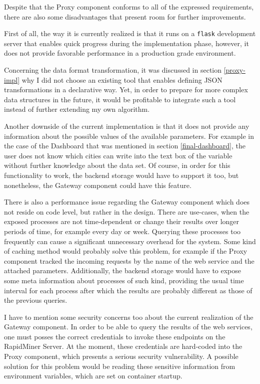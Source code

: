 

Despite that the Proxy component conforms to all of the expressed requirements, there are also some disadvantages that present room for further improvements.

First of all, the way it is currently realized is that it runs on a \texttt{flask} development server that enables quick progress during the implementation phase, however, it does not provide favorable performance in a production grade environment.

Concerning the data format transformation, it was discussed in section \ref{proxy-impl} why I did not choose an existing tool that enables defining JSON transformations in a declarative way. Yet, in order to prepare for more complex data structures in the future, it would be profitable to integrate such a tool instead of further extending my own algorithm.

Another downside of the current implementation is that it does not provide any information about the possible values of the available parameters. For example in the case of the Dashboard that was mentioned in section \ref{final-dashboard}, the user does not know which cities can write into the text box of the variable without further knowledge about the data set. Of course, in order for this functionality to work, the backend storage would have to support it too, but nonetheless, the Gateway component could have this feature.

There is also a performance issue regarding the Gateway component which does not reside on code level, but rather in the design. There are use-cases, when the exposed processes are not time-dependent or change their results over longer periods of time, for example every day or week. Querying these processes too frequently can cause a significant unnecessary overhead for the system. Some kind of caching method would probably solve this problem, for example if the Proxy component tracked the incoming requests by the name of the web service and the attached parameters. Additionally, the backend storage would have to expose some meta information about processes of such kind, providing the usual time interval for each process after which the results are probably different as those of the previous queries.

I have to mention some security concerns too about the current realization of the Gateway component. In order to be able to query the results of the web services, one must posses the correct credentials to invoke these endpoints on the RapidMiner Server. At the moment, these credentials are hard-coded into the Proxy component, which presents a serious security vulnerability. A possible solution for this problem would be reading these sensitive information from environment variables, which are set on container startup.

